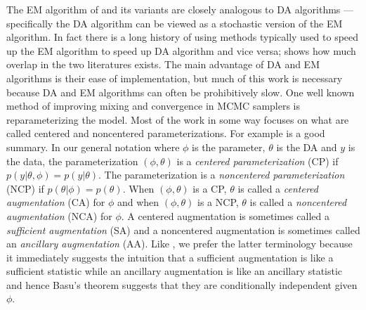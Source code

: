 \documentclass{article}
\begin{document}
The EM algorithm of  and its variants are closely analogous to DA algorithms --- specifically the DA algorithm can be viewed as a stochastic version of the EM algorithm. In fact there is a long history of using methods typically used to speed up the EM algorithm to speed up DA algorithm and vice versa;  shows how much overlap in the two literatures exists. The main advantage of DA and EM algorithms is their ease of implementation, but much of this work is necessary because DA and EM algorithms can often be prohibitively slow. One well known method of improving mixing and convergence in MCMC samplers is reparameterizing the model. Most of the work in some way focuses on what are called centered and noncentered parameterizations. For example  is a good summary. In our general notation where $\phi$ is the parameter, $\theta$ is the DA and $y$ is the data, the parameterization $(\phi,\theta)$ is a {\it centered parameterization} (CP) if $p(y|\theta,\phi)=p(y|\theta)$. The parameterization is a {\it noncentered parameterization} (NCP) if $p(\theta|\phi)=p(\theta)$. When $(\phi,\theta)$ is a CP, $\theta$ is called a {\it centered augmentation} (CA) for $\phi$ and when $(\phi,\theta)$ is a NCP, $\theta$ is called a {\it noncentered augmentation} (NCA) for $\phi$. A centered augmentation is sometimes called a {\it sufficient augmentation} (SA) and a noncentered augmentation is sometimes called an {\it ancillary augmentation} (AA)\cite{yu2011center}. Like , we prefer the latter terminology because it immediately suggests the intuition that a sufficient augmentation is like a sufficient statistic while an ancillary augmentation is like an ancillary statistic and hence Basu's theorem suggests that they are conditionally independent given $\phi$. 
\end{document}
